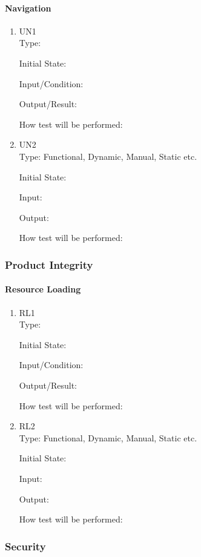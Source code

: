\documentclass[12pt, titlepage]{article}
\begin{document}
	\paragraph{Navigation}
	\begin{enumerate}
		\item{UN1\\}
		Type: 
		
		Initial State: 
		
		Input/Condition: 
		
		Output/Result: 
		
		How test will be performed: 
		
		\item{UN2\\}
		Type: Functional, Dynamic, Manual, Static etc.
		
		Initial State: 
		
		Input: 
		
		Output: 
		
		How test will be performed: 
	\end{enumerate}

	\subsubsection{Product Integrity}
	\paragraph{Resource Loading}
	\begin{enumerate}
		\item{RL1\\}
		Type: 
		
		Initial State: 
		
		Input/Condition: 
		
		Output/Result: 
		
		How test will be performed: 
		
		\item{RL2\\}
		Type: Functional, Dynamic, Manual, Static etc.
		
		Initial State: 
		
		Input: 
		
		Output: 
		
		How test will be performed: 
	\end{enumerate}
	
	\subsubsection{Security}
\end{document}
